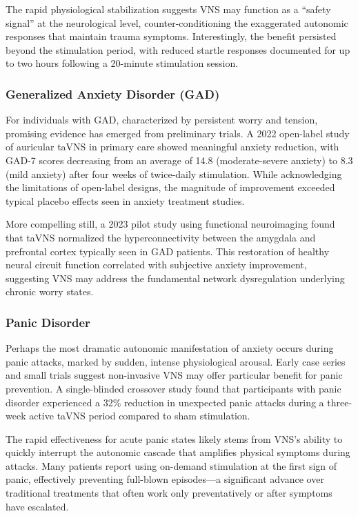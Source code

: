 \documentclass[
  Letterpaper,
]{scrbook}
\begin{document}
The rapid physiological stabilization suggests VNS may function as a
``safety signal'' at the neurological level, counter-conditioning the
exaggerated autonomic responses that maintain trauma symptoms.
Interestingly, the benefit persisted beyond the stimulation period, with
reduced startle responses documented for up to two hours following a
20-minute stimulation session.

\subsubsection{Generalized Anxiety Disorder
(GAD)}\label{generalized-anxiety-disorder-gad}

For individuals with GAD, characterized by persistent worry and tension,
promising evidence has emerged from preliminary trials. A 2022
open-label study of auricular taVNS in primary care showed meaningful
anxiety reduction, with GAD-7 scores decreasing from an average of 14.8
(moderate-severe anxiety) to 8.3 (mild anxiety) after four weeks of
twice-daily stimulation. While acknowledging the limitations of
open-label designs, the magnitude of improvement exceeded typical
placebo effects seen in anxiety treatment studies.

More compelling still, a 2023 pilot study using functional neuroimaging
found that taVNS normalized the hyperconnectivity between the amygdala
and prefrontal cortex typically seen in GAD patients. This restoration
of healthy neural circuit function correlated with subjective anxiety
improvement, suggesting VNS may address the fundamental network
dysregulation underlying chronic worry states.

\subsubsection{Panic Disorder}\label{panic-disorder}

Perhaps the most dramatic autonomic manifestation of anxiety occurs
during panic attacks, marked by sudden, intense physiological arousal.
Early case series and small trials suggest non-invasive VNS may offer
particular benefit for panic prevention. A single-blinded crossover
study found that participants with panic disorder experienced a 32\%
reduction in unexpected panic attacks during a three-week active taVNS
period compared to sham stimulation.

The rapid effectiveness for acute panic states likely stems from VNS's
ability to quickly interrupt the autonomic cascade that amplifies
physical symptoms during attacks. Many patients report using on-demand
stimulation at the first sign of panic, effectively preventing
full-blown episodes---a significant advance over traditional treatments
that often work only preventatively or after symptoms have escalated.
\end{document}
